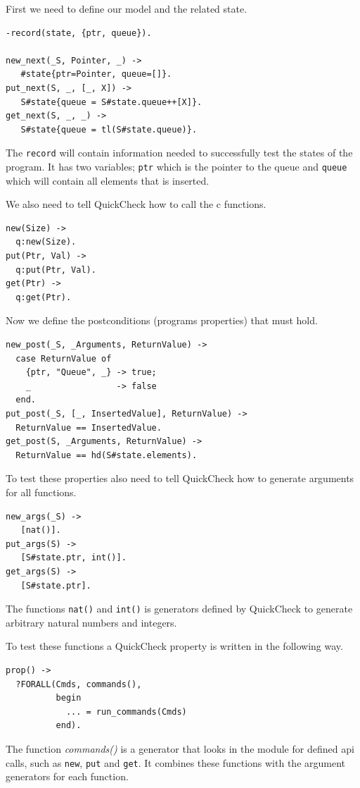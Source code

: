 First we need to define our model and the related state.
\begin{lstlisting}
-record(state, {ptr, queue}).

new_next(_S, Pointer, _) ->
   #state{ptr=Pointer, queue=[]}.
put_next(S, _, [_, X]) ->
   S#state{queue = S#state.queue++[X]}.
get_next(S, _, _) ->
   S#state{queue = tl(S#state.queue)}.
\end{lstlisting}

The \lstinline!record! will contain information needed to successfully
test the states of the program. It has two variables;
\lstinline!ptr! which is the pointer to the queue and
\lstinline!queue! which will contain all elements that is inserted.

We also need to tell QuickCheck how to call the c functions.
\begin{lstlisting}
new(Size) ->
  q:new(Size).
put(Ptr, Val) ->
  q:put(Ptr, Val).
get(Ptr) ->
  q:get(Ptr).
\end{lstlisting}

Now we define the postconditions (programs properties) that must hold.
\begin{lstlisting}
new_post(_S, _Arguments, ReturnValue) ->
  case ReturnValue of
    {ptr, "Queue", _} -> true;
    _                 -> false
  end.
put_post(_S, [_, InsertedValue], ReturnValue) ->
  ReturnValue == InsertedValue.
get_post(S, _Arguments, ReturnValue) ->
  ReturnValue == hd(S#state.elements).
\end{lstlisting}

To test these properties also need to tell QuickCheck how to generate
arguments for all functions.
\begin{lstlisting}
new_args(_S) ->
   [nat()].
put_args(S) ->
   [S#state.ptr, int()].
get_args(S) ->
   [S#state.ptr].
\end{lstlisting}
The functions \lstinline!nat()! and \lstinline!int()! is generators
defined by QuickCheck to generate arbitrary natural numbers and integers.

To test these functions a QuickCheck property is written in the
following way.
\lstset{style=erlang}
\begin{lstlisting}
prop() ->
  ?FORALL(Cmds, commands(),
          begin
            ... = run_commands(Cmds)
          end).
\end{lstlisting}

The function \emph{commands()} is a generator that looks in the module
for defined api calls, such as \lstinline!new!, \lstinline!put! and
\lstinline!get!. It combines these functions with the argument
generators for each function.

